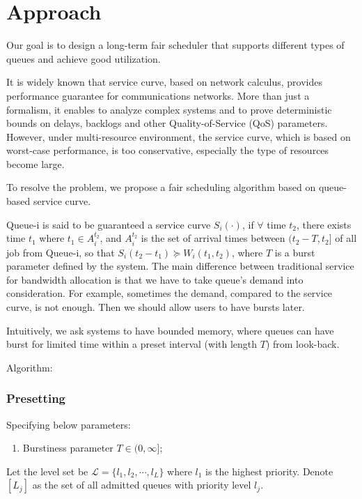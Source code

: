 \section{Approach}
Our goal is to design a long-term fair scheduler that supports different types of queues and achieve good utilization. 

It is widely known that service curve, based on network calculus, provides performance guarantee for communications networks. More than just a formalism, it enables to analyze complex systems and to prove deterministic bounds on delays, backlogs and other
Quality-of-Service (QoS) parameters. However, under multi-resource environment, the service curve, which is based on worst-case performance, is too conservative, especially the type of resources become large.

To resolve the problem, we propose a fair scheduling algorithm based on queue-based service curve.


Queue-i is said to be guaranteed a service curve $S_i(\cdot)$, if $\forall$ time $t_2$, there exists time $t_1$ where $t_1 \in A_i^{t_2}$, and $A_i^{t_2}$ is the set of arrival times between $(t_2-T,t_2]$ of all job from Queue-i, so that $S_i(t_2-t_1) \succeq W_i(t_1,t_2)$, where $T$ is a burst parameter defined by the system. The main difference between traditional service for bandwidth allocation is that we have to take queue's demand into consideration. For example, sometimes the demand, compared to the service curve, is not enough. Then we should allow users to have bursts later.

Intuitively, we ask systems to have bounded memory, where queues can have burst for limited time within a preset interval (with length $T$) from look-back.


Algorithm: 
\subsubsection*{Presetting}
Specifying below parameters: \begin{enumerate}
	\item Burstiness parameter $T \in (0,\infty]$;
\end{enumerate}
Let the level set be $\mathcal{L} = \{l_1,l_2,\cdots, l_L\}$ where $l_1$ is the highest priority. Denote $[L_j]$ as the set of all admitted queues with priority level $l_j$.


